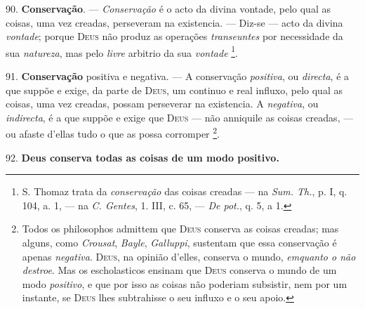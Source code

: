 90. \textbf{Conservação}. --- \emph{Conservação} é o acto da divina vontade, pelo qual as coisas, uma vez creadas, perseveram na existencia. --- Diz-se --- acto da divina \emph{vontade}; porque \textsc{Deus} não produz as operações \emph{transeuntes} por necessidade da sua \emph{natureza}, mas pelo \emph{livre} arbitrio da sua \emph{vontade} \footnote{S. Thomaz trata da \emph{conservação} das coisas creadas --- na \emph{Sum. Th.}, p. I, q. 104, a. 1, --- na \emph{C. Gentes}, 1. III, c. 65, --- \emph{De pot.}, q. 5, a 1.}.

91. \textbf{Conservação} positiva e negativa. --- A conservação \emph{positiva}, ou \emph{directa}, é a que suppõe e exige, da parte de \textsc{Deus}, um   continuo e real influxo, pelo qual as coisas, uma vez creadas, possam perseverar na existencia. A \emph{negativa}, ou \emph{indirecta}, é a que suppõe e exige que \textsc{Deus} --- não anniquile as coisas creadas, --- ou afaste d'ellas tudo o que as possa corromper \footnote{Todos os philosophos admittem que \textsc{Deus} conserva as coisas creadas; mas alguns, como \emph{Crousat}, \emph{Bayle}, \emph{Galluppi}, sustentam que essa conservação é apenas \emph{negativa}. \textsc{Deus}, na opinião d'elles, conserva o mundo, \emph{emquanto o não destroe}. Mas os escholasticos ensinam que \textsc{Deus} conserva o mundo de um modo \emph{positivo}, e que por isso as coisas não poderiam subsistir, nem por um instante, se \textsc{Deus} lhes subtrahisse o seu influxo e o seu apoio.}.

92. \textbf{Deus conserva todas as coisas de um modo positivo.}

